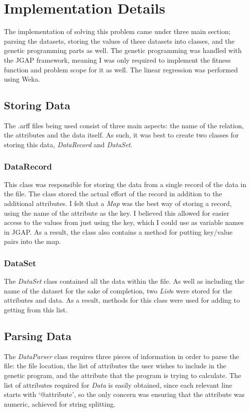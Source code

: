 \documentclass[11pt, a4paper]{article}
\begin{document}
\section{Implementation Details} %
\label{sec:implementation_details}
The implementation of solving this problem came under three main section;
parsing the datasets, storing the values of these datasets into classes, and the
genetic programming parts as well. The genetic programming was handled with the
JGAP framework, meaning I was only required to implement the fitness function
and problem scope for it as well. The linear regression was performed using
Weka.

\subsection{Storing Data} %
\label{sub:storing_data}
The .arff files being used consist of three main aspects: the name of the
relation, the attributes and the data itself. As such, it was best to create two
classes for storing this data, \emph{DataRecord} and \emph{DataSet}.

\subsubsection{DataRecord} %
\label{ssub:datarecord}
This class was responsible for storing the data from a single record of the data
in the file. The class stored the actual effort of the record in addition to the
additional attributes. I felt that a \emph{Map} was the best way of storing a
record, using the name of the attribute as the key. I believed this allowed for
easier access to the values from just using the key, which I could use as
variable names in JGAP. As a result, the class also contains a method for
putting key/value pairs into the map.

\subsubsection{DataSet} %
\label{ssub:dataset}
The \emph{DataSet} class contained all the data within the file. As well as
including the name of the dataset for the sake of completion, two \emph{List}s
were stored for the attributes and data. As a result, methods for this class
were used for adding to getting from this list.

\subsection{Parsing Data} %
\label{sub:parsing_data}
The \emph{DataParser} class requires three pieces of information in order to
parse the file: the file location, the list of attributes the user wishes to
include in the genetic program, and the attribute that the program is trying to
calculate. The list of attributes required for \emph{Data} is easily obtained,
since each relevant line starts with `@attribute', so the only concern was
ensuring that the attribute was numeric, achieved for string splitting.
\end{document}

